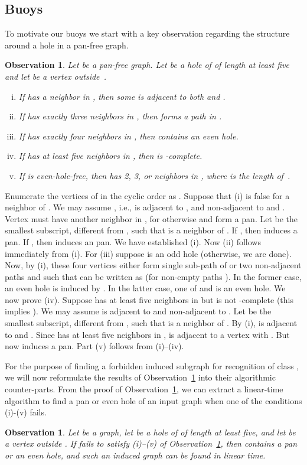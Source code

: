 \documentclass[11pt,a4paper]{article}
\newtheorem{observation}[theorem]{Observation}
\newenvironment{proof}{\noindent {\it Proof:~}}{\hfill \smallskip\par}
\begin{document}
\subsection{Buoys}
\label{sec:buoy}
To motivate our buoys we start with a key observation
regarding the structure around a hole in a pan-free graph.
\begin{observation}\label{obs:neighbors}
Let  be a pan-free graph. Let  be a hole of  of length
at least five and let  be a vertex outside~.
\begin{enumerate}[(i)]
 \item If  has a neighbor  in , then some  is
 adjacent to both  and .
\item If  has exactly three neighbors  in
 , then  forms a path in .
 \item If  has exactly four neighbors in , then 
 contains an even hole.
 \item If  has at least five neighbors in , then  is
 -complete.
  \item If  is even-hole-free, then  has 2, 3, or  neighbors in , where
   is the length of~.
\end{enumerate}
\end{observation}

\begin{proof}
Enumerate the vertices of  in the cyclic order as . Suppose that (i) is false for a neighbor 
of . We may assume , i.e.,  is adjacent to ,
and non-adjacent to  and . Vertex  must have
another neighbor in , for otherwise  and  form a pan. Let
 be the smallest subscript, different from , such that 
is a neighbor of . If , then  induces a pan. If , then
 induces an pan. We
have established (i).
Now (ii) follows immediately from (i). For (iii) suppose  is
an odd hole (otherwise, we are done). Now, by (i), these four
vertices either form single sub-path 
of  or two non-adjacent paths  and 
such that  can be written as 
(for non-empty paths ). In the former case, an even hole
is induced by . In the latter
case, one of  and  is an
even hole. We now prove (iv). Suppose  has at least five
neighbors in  but is not -complete (this implies ). We may assume  is adjacent to  and non-adjacent to
. Let  be the smallest subscript, different from , such
that  is a neighbor of . By (i),  is adjacent to
 and . Since  has at least five neighbors
in ,  is adjacent to a vertex  with . But now  induces a pan.
Part (v) follows from (i)--(iv).
\end{proof}
For the purpose of finding a forbidden induced subgraph for
recognition of  class , we will now reformulate the
results of Observation~\ref{obs:neighbors} into their algorithmic
counter-parts. From the proof  of Observation~\ref{obs:neighbors},
we can extract a linear-time algorithm to find a pan or even hole
of an input graph when one of the conditions (i)-(v) fails.
\begin{observation}\label{obs:find-neighbors}
Let  be a graph, let  be a hole of  of length at least five,
and let  be a vertex outside . If  fails to satisfy (i)--(v)
of Observation~\ref{obs:neighbors}, then  contains a pan or an
even hole, and such an induced graph can be found in linear time.
\hfill 
\end{observation}
\end{document}
